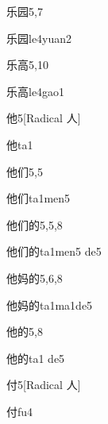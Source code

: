 \begin{entry}{乐园}{5,7}
  \begin{phonetics}{乐园}{le4yuan2}
  \end{phonetics}
\end{entry}

\begin{entry}{乐高}{5,10}
  \begin{phonetics}{乐高}{le4gao1}
  \end{phonetics}
\end{entry}

\begin{entry}{他}{5}[Radical 人]
  \begin{phonetics}{他}{ta1}
  \end{phonetics}
\end{entry}

\begin{entry}{他们}{5,5}
  \begin{phonetics}{他们}{ta1men5}
  \end{phonetics}
\end{entry}

\begin{entry}{他们的}{5,5,8}
  \begin{phonetics}{他们的}{ta1men5 de5}
  \end{phonetics}
\end{entry}

\begin{entry}{他妈的}{5,6,8}
  \begin{phonetics}{他妈的}{ta1ma1de5}
  \end{phonetics}
\end{entry}

\begin{entry}{他的}{5,8}
  \begin{phonetics}{他的}{ta1 de5}
  \end{phonetics}
\end{entry}

\begin{entry}{付}{5}[Radical 人]
  \begin{phonetics}{付}{fu4}
  \end{phonetics}
\end{entry}


